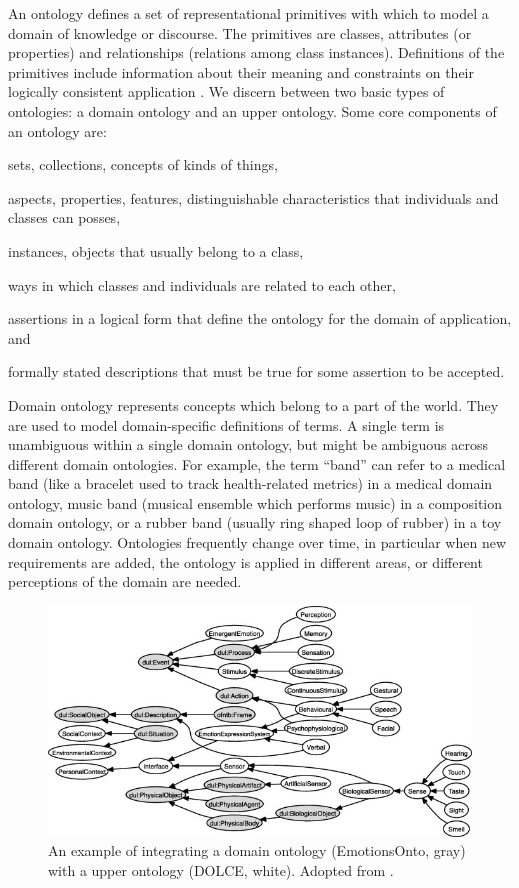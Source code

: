 An ontology defines a set of representational primitives with which to model 
a domain of knowledge or discourse. The primitives are classes, attributes
(or properties) and relationships (relations among class instances). 
Definitions of the primitives include information about their
meaning and constraints on their logically consistent application
\citep{gruber2009ontology}.
We discern between two basic types of ontologies: a domain ontology and an
upper ontology.
Some core components of an ontology are:
\begin{description}[leftmargin=!,labelwidth=\widthof{\bfseries Restrictions}]
\item[Classes] sets, collections, concepts of kinds of things,
\item[Attributes] aspects, properties, features, distinguishable characteristics that
	individuals and classes can posses,
\item[Individuals] instances, objects that usually belong to a class,
\item[Relations] ways in which classes and individuals are related to each other,
\item[Axioms] assertions in a logical form that define the ontology for the domain of application, and
\item[Restrictions] formally stated descriptions that must be true for some assertion to be accepted. 
\end{description}

Domain ontology represents concepts which belong to a part of the world. 
They are used to model domain-specific definitions of terms. A single term is
unambiguous within a single domain ontology, but might be ambiguous across
different domain ontologies. For example, the term ``band'' can refer to a
medical band (like a bracelet used to track health-related metrics) in a
medical domain ontology, music band (musical ensemble which performs music) in
a composition domain ontology, or a rubber band (usually ring shaped loop of
rubber) in a toy domain ontology. Ontologies frequently change over time, 
in particular when new requirements are added, 
the ontology is applied in different areas, or different 
perceptions of the domain are needed.

\begin{figure}
	\includegraphics{upper_domain_interaction.jpg}
	\caption{An example of integrating a domain ontology
	(EmotionsOnto, gray) with a upper ontology (DOLCE, white).
	Adopted from \citep{gil2015emotions}.
	}
	\label{fig:upper_domain_integration}
\end{figure}

